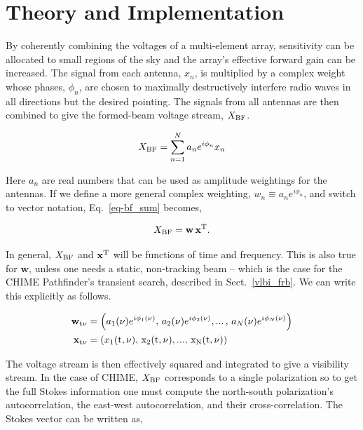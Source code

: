   
\section{Theory and Implementation}
\label{sec:theory}

By coherently combining the voltages of a multi-element array, 
sensitivity can be allocated to small regions of the sky and 
the array's effective forward gain can be increased. The signal 
from each antenna, $x_n$, is multiplied by a complex weight whose 
phases, $\phi_{n}$, are chosen to maximally destructively interfere radio waves 
in all directions but the desired pointing. The signals 
from all antennas are then combined to give the formed-beam 
voltage stream, $X_{\rm BF}$.

\begin{equation}
\label{eq-bf_sum}
X_{\rm BF} = \sum_{{n}=1}^N a_n e^{i\phi_{n}} x_n
\end{equation}

\noindent Here $a_n$ are real numbers that can be used as 
amplitude weightings for the antennas. If we define a more 
general complex weighting, $w_n \equiv a_n e^{i\phi_{n}}$, and 
switch to vector notation, Eq.~\ref{eq-bf_sum} becomes,

\begin{equation}
X_{\rm BF} = \mathbf{w} \, \mathbf{x}^{\rm T} .
\end{equation}

\noindent In general, $X_{\rm BF}$ and $\mathbf{x}^{\rm T}$ will be 
functions of time and frequency. This is also true for $\mathbf{w}$,
unless one needs a static, non-tracking beam -- which is the case for the 
CHIME Pathfinder's transient search, described in
Sect.~\ref{vlbi_frb}. We can write this explicitly as follows. 


\begin{align}
     \mathbf{w}_{\rm t \nu} &= \left (a_1(\nu) e^{i \phi_1(\nu)}, \, 
     a_2(\nu) e^{i \phi_2(\nu)}, ... \,, \,a_N(\nu) e^{i \phi_N(\nu)} \right )\\
     \mathbf{x}_{\rm t \nu} &= \left ( x_1(\rm{t}, \nu), \, x_2(\rm{t}, \nu), 
     ..., \, x_N(\rm{t}, \nu) \right )
\end{align}

The voltage stream is then effectively squared and integrated 
to give a visibility stream. 
In the case of CHIME, $X_{\rm BF}$ corresponds to a single polarization 
so to get the full Stokes information one must compute the 
north-south polarization's autocorrelation, the east-west autocorrelation, 
and their cross-correlation. The Stokes vector can be written as,

